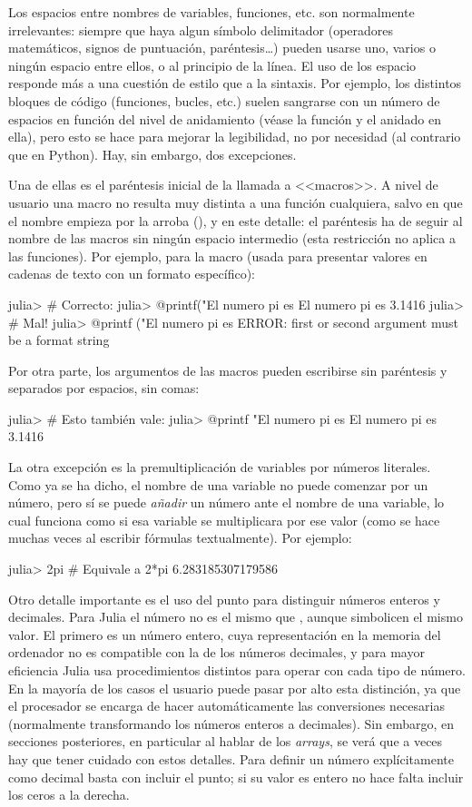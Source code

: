 ﻿\documentclass[spanish]{article}
\begin{document}
Los espacios entre nombres de variables, funciones, etc.
son normalmente irrelevantes: siempre que haya algun símbolo delimitador
(operadores matemáticos, signos de puntuación, paréntesis\ldots) pueden
usarse uno, varios o ningún espacio entre ellos, o al principio de la línea.
El uso de los espacio responde más a una cuestión de estilo que a la
sintaxis. Por ejemplo, los distintos bloques de código (funciones,
bucles, etc.) suelen sangrarse con un número de espacios en función
del nivel de anidamiento (véase la función  y el
 anidado en ella), pero esto se hace para mejorar la legibilidad, no
por necesidad (al contrario que en Python). Hay, sin embargo,
dos excepciones.

Una de ellas es el paréntesis inicial de la llamada a <<macros>>.
A nivel de usuario una macro no resulta muy
distinta a una función cualquiera, salvo en que el nombre empieza por
la arroba (), y en este detalle: el paréntesis ha de
seguir al nombre de las macros sin ningún espacio intermedio
(esta restricción no aplica a las funciones). Por ejemplo, para
la macro  (usada para presentar valores en cadenas de texto con
un formato específico):

julia> # Correcto:
julia> @printf("El numero pi es %
El numero pi es 3.1416
julia> # Mal!
julia> @printf ("El numero pi es %
ERROR: first or second argument must be a format string

Por otra parte, los argumentos de las macros pueden escribirse sin
paréntesis y separados por espacios, sin comas:

julia> # Esto también vale:
julia> @printf "El numero pi es %
El numero pi es 3.1416

La otra excepción es la premultiplicación de variables por números literales.
Como ya se ha dicho, el nombre de una variable no puede comenzar por
un número, pero sí se puede \emph{añadir} un número ante el nombre
de una variable, lo cual funciona como si esa variable se multiplicara
por ese valor (como se hace muchas veces al escribir fórmulas textualmente).
Por ejemplo:

julia> 2pi # Equivale a 2*pi
6.283185307179586

Otro detalle importante es el uso del punto para distinguir
números enteros y decimales. Para Julia el número 
no es el mismo que , aunque simbolicen el mismo valor.
El primero es un número entero, cuya representación en la memoria
del ordenador no es compatible con la de los números decimales,
y para mayor eficiencia Julia usa procedimientos distintos para
operar con cada tipo de número. En la mayoría de los casos
el usuario puede pasar por alto esta distinción, ya que
el procesador se encarga de hacer automáticamente las
conversiones necesarias (normalmente transformando los números
enteros a decimales). Sin embargo, en secciones posteriores,
en particular al hablar de los \emph{arrays}, se verá que
a veces hay que tener cuidado con estos detalles.
Para definir un número explícitamente como decimal basta
con incluir el punto; si su valor es entero no hace falta
incluir los ceros a la derecha.
\end{document}
